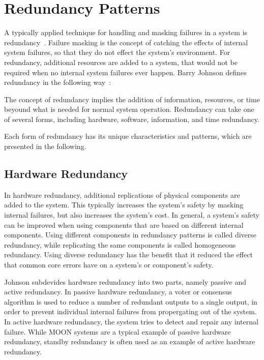 
\section{Redundancy Patterns}
A typically applied technique for handling and masking failures in a system is redundancy~\cite{TanenbaumSteen07}.
Failure masking is the concept of catching the effects of internal system failures, so that they do not effect the system's environment.
For redundancy, additional resources are added to a system, that would not be required when no internal system failures ever happen.
Barry Johnson defines redundancy in the following way~\cite{BarryFaultToleranceAnalysis}:
\begin{definition}
The concept of redundancy implies the addition of information, resources, or time beyound what is needed for normal system operation.
Redundancy can take one of several forms, including hardware, software, information, and time redundancy.
\end{definition}

Each form of redundancy has its unique characteristics and patterns, which are presented in the following.

\subsection{Hardware Redundancy}
In hardware redundancy, additional replications of physical components are added to the system.
This typically increases the system's safety by masking internal failures, but also increases the system's cost.
In general, a system's safety can be improved when using components that are based on different internal components.
Using different components in redundancy patterns is called diverse redundancy, while replicating the same components is called homogeneous redundancy.
Using diverse redundancy has the benefit that it reduced the effect that common core errors have on a system's or component's safety.

Johnson subdevides hardware redundancy into two parts, namely passive and active redundancy.
In passive hardware redundancy, a voter or consensus algorithm is used to reduce a number of redundant outputs to a single output, in order to prevent individual internal failures from propergating out of the system.
In active hardware redundancy, the system tries to detect and repair any internal failure.
While \gls*{MOON} systems are a typical example of passive hardware redundancy, standby redundancy is often used as an example of active hardware redundancy.

